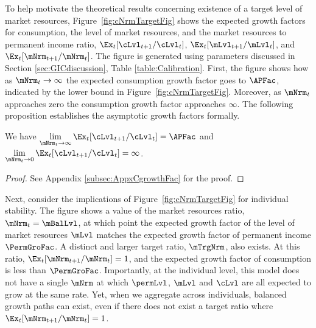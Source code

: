 \documentclass[BufferStockTheory]{subfiles}
\begin{document}
To help motivate the theoretical results concerning existence of a target level of market resources, Figure~\ref{fig:cNrmTargetFig} shows the expected growth factors for consumption, the level of market resources, and the market resources to permanent income ratio, $\Ex_{t}[\cLvl_{t+1}/\cLvl_{t}]$, $\Ex_{t}[\mLvl_{t+1}/\mLvl_{t}]$, and $\Ex_{t}[\mNrm_{t+1}/\mNrm_{t}]$.
The figure is generated using parameters discussed in Section \ref{sec:GICdiscussion}, Table \ref{table:Calibration}.
First, the figure shows how as $\mNrm_{t} \rightarrow \infty$ the expected consumption growth factor goes to ${\APFac}$, indicated by the lower bound in Figure~\ref{fig:cNrmTargetFig}.
Moreover, as $\mNrm_{t}$ approaches zero the consumption growth factor approaches $\infty$.
The following proposition establishes the asymptotic growth factors formally. 

\begin{proposition}\label{prop:convgGrowth}\hypertarget{LimitsAsmtToZero}{}
We have $\lim\limits_{\mNrm_{t} \rightarrow \infty} \Ex_{t}[\cLvl_{t+1}/\cLvl_{t}] =  {\APFac}$ and $\lim\limits_{\mNrm_{t} \rightarrow  0} \Ex_{t}[\cLvl_{t+1}/\cLvl_{t}] =  \infty$. 
\end{proposition}
\begin{proof}\let\qed\relax
See Appendix \ref{subsec:AppxCgrowthFac} for the proof. 
\end{proof}

Next, consider the implications of Figure~\ref{fig:cNrmTargetFig} for individual stability.
The figure shows a value of the market resources ratio, $\mNrm_{t} = \mBalLvl$, at which point the expected growth factor of the level of market resources $\mLvl$ matches the expected growth factor of permanent income $\PermGroFac$.
A distinct and larger target ratio, $\mTrgNrm$, also exists.
At this ratio, $\Ex_{t}[\mNrm_{t+1}/\mNrm_{t}]=1$, and the expected growth factor of consumption is less than $\PermGroFac$.
Importantly, at the individual level, this model does not have a single $\mNrm$ at which $\permLvl$, $\mLvl$ and $\cLvl$ are all expected to grow at the same rate.
Yet, when we aggregate across individuals, balanced growth paths can exist, even if there does not exist a target ratio where $\Ex_{t}[\mNrm_{t+1}/\mNrm_{t}]=1$.
\end{document}
